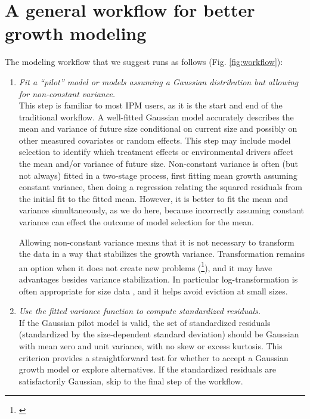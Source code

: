 \documentclass[12pt]{article}
\newcommand{\tom}[2]{{\color{red}{#1}}\footnote{\textit{\color{red}{#2}}}}
\begin{document}
\section{A general workflow for better growth modeling}
The modeling workflow that we suggest runs as follows (Fig. \ref{fig:workflow}):
\begin{enumerate}
\item \textit{Fit a ``pilot'' model or models assuming a Gaussian distribution but allowing for non-constant variance.}
\\ 
This step is familiar to most IPM users, as it is the start and end of the traditional workflow. 
A well-fitted Gaussian model accurately describes the mean and variance of future size conditional on current size and 
possibly on other measured covariates or random effects. 
This step may include model selection to identify which treatment effects or environmental drivers affect the mean and/or 
variance of future size. 
Non-constant variance is often (but not always) fitted in a two-stage process, first fitting mean growth assuming constant variance, 
then doing a regression relating the squared residuals from the initial fit to the fitted mean. 
However, it is better to fit the mean and variance simultaneously, as we do here, because incorrectly assuming constant variance 
can effect the outcome of model selection for the mean.  

Allowing non-constant variance means that it is not necessary to transform the data in a way that stabilizes the growth variance. 
Transformation remains an option when it does not create new problems (\tom{discussed later}{I think we will need to talk about the beta regression approach in the Discussion, and that could be a place to give an example of `new problems'.}), and it may have advantages besides variance stabilization.
In particular log-transformation is often appropriate for size data \citep{ellner-etal-2016}, and it helps avoid eviction at small sizes. 

\item \textit{Use the fitted variance function to compute standardized residuals.}
\\
If the Gaussian pilot model is valid, the set of standardized residuals (standardized by the size-dependent standard deviation) should be Gaussian with mean zero and unit variance, with no skew or excess kurtosis. 
This criterion provides a straightforward test for whether to accept a Gaussian growth model or explore alternatives. 
If the standardized residuals are satisfactorily Gaussian, skip to the final step of the workflow. 


\end{enumerate}
\end{document}
